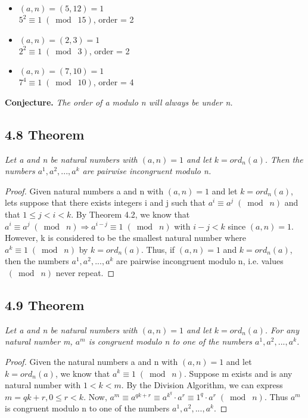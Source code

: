 \documentclass{article}
\begin{document}
\begin{itemize}
    \item $(a, n) = (5, 12) = 1$\\
          $5^2 \equiv 1 \;(\bmod\; 15)$, order = 2
    \item $(a, n) = (2, 3) = 1$\\
          $2^2 \equiv 1 \;(\bmod\; 3)$, order = 2
    \item $(a, n) = (7, 10) = 1$\\
          $7^4 \equiv 1 \;(\bmod\; 10)$, order = 4
\end{itemize}

\textbf{Conjecture.} \textit{The order of a modulo n  will always be under n.}

\subsection*{4.8 Theorem} 
\quad \textit{Let a and n be natural numbers with $(a, n) = 1$ and let $k = ord_n(a)$. Then the numbers $a^1, a^2,...,a^k$ are pairwise incongruent modulo n.}

\begin{proof}
Given natural numbers a and n with $(a, n) = 1$ and let $k = ord_n(a)$, lets suppose that there exists integers i and j such that $a^i \equiv a^j \;(\bmod\; n)$ and that $1 \leq j < i < k$. By Theorem 4.2, we know that $a^i \equiv a^j \;(\bmod\; n) \Longrightarrow a^{i-j} \equiv 1 \;(\bmod\; n)$ with $i-j < k$ since $(a, n) = 1$. However, k is considered to be the smallest natural number where $a^k \equiv 1 \;(\bmod\; n)$ by $k = ord_n(a)$. Thus, if $(a, n) = 1$ and $k = ord_n(a)$, then the numbers $a^1, a^2,...,a^k$ are pairwise incongruent modulo n, i.e. values $\;(\bmod\; n)$ never repeat.
\end{proof}

\subsection*{4.9 Theorem} 
\quad \textit{Let a and n be natural numbers with $(a, n) = 1$ and let $k = ord_n(a)$. For any natural number m, $a^m$ is congruent modulo n to one of the numbers $a^1, a^2,...,a^k$.}

\begin{proof}
Given the natural numbers a and n with $(a, n) = 1$ and let $k = ord_n(a)$, we know  that $a^k \equiv 1 \;(\bmod\; n)$. Suppose m exists and is any natural number with $1 < k < m$. By the Division Algorithm, we can express $m = qk + r, 0 \leq r < k$. Now, $a^m \equiv a^{qk+r} \equiv a^{k}^{q}\cdot a^r \equiv 1^q \cdot a^r \;(\bmod\; n)$. Thus $a^m$ is congruent modulo n to one of the numbers $a^1, a^2,...,a^k$.
\end{proof}
\end{document}

